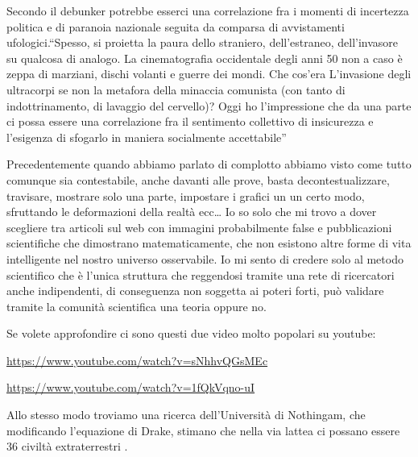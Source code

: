 \documentclass[12pt]{book} %
\begin{document}
\bigskip

Secondo il debunker potrebbe esserci una correlazione fra i momenti di incertezza politica e di paranoia nazionale
seguita da comparsa di avvistamenti ufologici.“Spesso, si proietta la paura dello straniero,
dell'estraneo, dell'invasore su qualcosa di analogo. La cinematografia
occidentale degli anni 50 non a caso è zeppa di marziani, dischi volanti e guerre dei mondi. Che
cos'era L'invasione degli ultracorpi se non la metafora della minaccia
comunista (con tanto di indottrinamento, di lavaggio del cervello)? Oggi ho l'impressione che da
una parte ci possa essere una correlazione fra il sentimento collettivo di insicurezza e
l'esigenza di sfogarlo in maniera socialmente
accettabile”


\bigskip

Precedentemente quando abbiamo parlato di complotto abbiamo visto come tutto comunque sia contestabile, anche davanti
alle prove, basta decontestualizzare, travisare, mostrare solo una parte, impostare i grafici un un certo modo,
sfruttando le deformazioni della realtà ecc… Io so solo che mi trovo a dover scegliere tra articoli sul web con
immagini probabilmente false e pubblicazioni scientifiche che dimostrano matematicamente, che non esistono altre forme
di vita intelligente nel nostro universo osservabile. Io mi sento di credere solo al metodo scientifico che è
l'unica struttura che reggendosi tramite una rete di ricercatori anche indipendenti, di
conseguenza non soggetta ai poteri forti, può validare tramite la comunità scientifica una teoria oppure
no.


\bigskip

Se volete approfondire ci sono questi due video molto popolari su youtube:

\protect\url{https://www.youtube.com/watch?v=sNhhvQGsMEc}

\protect\url{https://www.youtube.com/watch?v=1fQkVqno-uI}


\bigskip

Allo stesso modo troviamo una ricerca dell'Università di Nothingam, che modificando
l'equazione di Drake, stimano che nella via lattea ci possano essere 36 civiltà
extraterrestri
.
\end{document}
